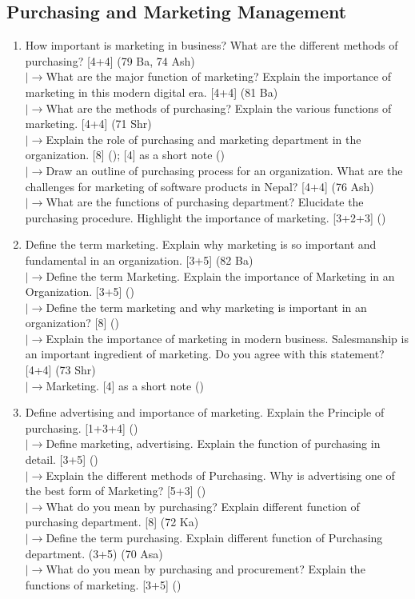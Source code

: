 \documentclass[12pt]{article}
\newcommand{\lb}{\\$\left|\rightarrow\right.$}
\begin{document}
  \subsection{Purchasing and Marketing Management}
    \begin{enumerate}[topsep=0pt, noitemsep]
      \item How important is marketing in business? What are the different methods of purchasing? \hfill [4+4] (79 Ba, 74 Ash)
        \lb What are the major function of marketing? Explain the importance of marketing in this modern digital era. \hfill [4+4] (81 Ba)
        \lb What are the methods of purchasing? Explain the various functions of marketing. \hfill [4+4] (71 Shr)
        \lb Explain the role of purchasing and marketing department in the organization. \hfill [8] (); [4] as a short note ()
        \lb Draw an outline of purchasing process for an organization. What are the challenges for marketing of software products in Nepal? \hfill [4+4] (76 Ash)
        \lb What are the functions of purchasing department? Elucidate the purchasing procedure. Highlight the importance of marketing. \hfill [3+2+3] ()

      \item Define the term marketing. Explain why marketing is so important and fundamental in an organization. \hfill [3+5] (82 Ba)
        \lb Define the term Marketing. Explain the importance of Marketing in an Organization. \hfill [3+5] ()
        \lb Define the term marketing and why marketing is important in an organization? \hfill [8] ()
        \lb Explain the importance of marketing in modern business. Salesmanship is an important ingredient of marketing. Do you agree with this statement? \hfill [4+4] (73 Shr)
        \lb Marketing. \hfill [4] as a short note ()

      \item Define advertising and importance of marketing. Explain the Principle of purchasing. \hfill [1+3+4] ()
        \lb Define marketing, advertising. Explain the function of purchasing in detail. \hfill [3+5] ()
        \lb Explain the different methods of Purchasing. Why is advertising one of the best form of Marketing? \hfill [5+3] ()
        \lb What do you mean by purchasing? Explain different function of purchasing department. \hfill [8] (72 Ka)
        \lb Define the term purchasing. Explain different function of Purchasing department. \hfill (3+5) (70 Asa)
        \lb What do you mean by purchasing and procurement? Explain the functions of marketing. \hfill [3+5] ()
    \end{enumerate}
\end{document}
